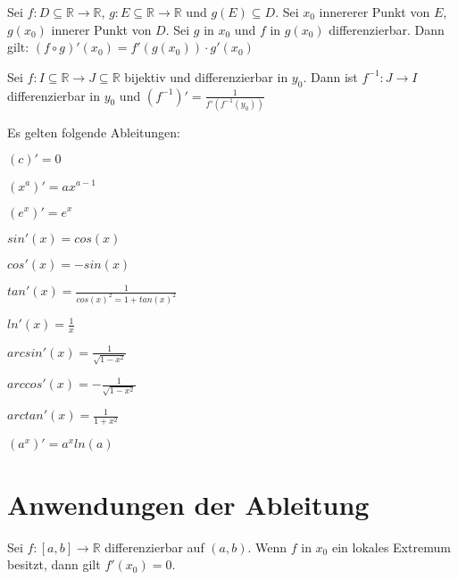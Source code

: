 \documentclass[]{article}
\begin{document}
\begin{satz}[Kettenregel]
	Sei $f : D \subseteq \mathbb{R} \rightarrow \mathbb{R}$, $g : E \subseteq \mathbb{R} \rightarrow \mathbb{R}$ und $g(E) \subseteq D$. Sei $x_0$ innererer Punkt von $E$, $g(x_0)$ innerer Punkt von $D$. Sei $g$ in $x_0$ und $f$ in $g(x_0)$ differenzierbar. Dann gilt: $(f \circ g)'(x_0) = f'(g(x_0)) \cdot g'(x_0)$
 \end{satz}

\begin{satz}
	Sei $f : I \subseteq \mathbb{R} \rightarrow J \subseteq \mathbb{R}$ bijektiv und differenzierbar in $y_0$. Dann ist $f^{-1} : J \rightarrow I$ differenzierbar in $y_0$ und $(f^{-1})'=\frac{1}{f'(f^{-1}(y_0))}$
\end{satz}

\begin{satz}
	Es gelten folgende Ableitungen:
	\begin{multicols}{2}
		\begin{description}[noitemsep]
			\item $(c)' = 0$
			\item $(x^a)'=ax^{a-1}$
			\item $(e^x)'=e^x$
			\item $sin'(x) = cos(x)$
			\item $cos'(x) = -sin(x)$
			\item $tan'(x) = \frac{1}{cos(x)^2 = 1 + tan(x)^2}$
			\item $ln'(x) = \frac{1}{x}$
			\item $arcsin'(x) = \frac{1}{\sqrt{1 -x^2}}$	
			\item $arccos'(x) = - \frac{1}{\sqrt{1 - x^2}}$	
			\item $arctan'(x) = \frac{1}{1 + x^2}$
			\item $(a^x)' = a^x ln(a)$
		\end{description}
	\end{multicols}
\end{satz}

\section{Anwendungen der Ableitung}

\begin{satz}
	Sei $f : [a,b] \rightarrow \mathbb{R}$ differenzierbar auf $(a,b)$. Wenn $f$ in $x_0$ ein lokales Extremum besitzt, dann gilt $f'(x_0) = 0$.
\end{satz}
\end{document}
